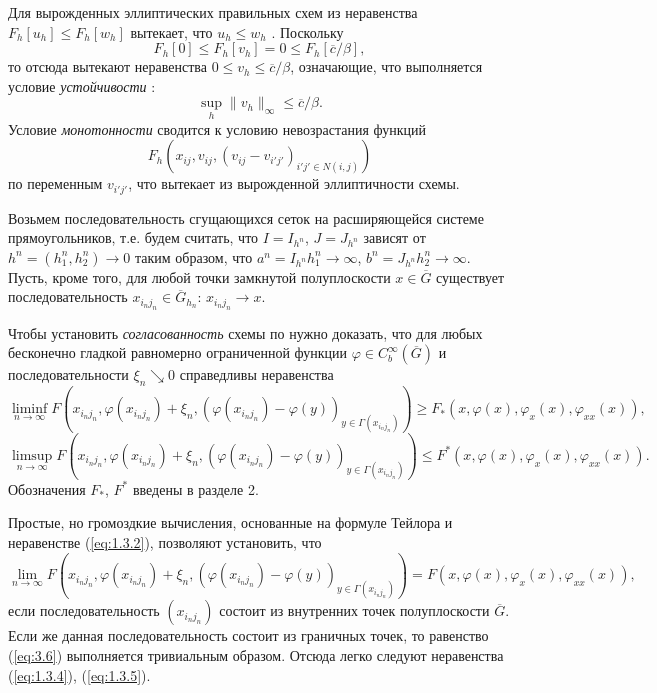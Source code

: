 Для вырожденных эллиптических правильных схем из неравенства $F_h[u_h]\le F_h[w_h]$ вытекает, что $u_h\le w_h$ \cite[теорема 5]{Obe06}. Поскольку
$$ F_h[0]\le F_h[v_h]=0\le F_h[\overline{c}/\beta],$$
то отсюда вытекают неравенства $0\le v_h\le\overline{c}/\beta$, означающие, что выполняется условие \emph{устойчивости} \cite{BarSou91}:
$$\sup_h\|v_h\|_\infty\le \overline{c}/\beta.$$
Условие \emph{монотонности} \cite{BarSou91} сводится к условию невозрастания функций
 $$F_h(x_{ij},v_{ij},(v_{ij}-v_{i'j'})_{i'j'\in N(i,j)})$$
по переменным $v_{i'j'}$, что вытекает из вырожденной эллиптичности схемы.

Возьмем последовательность сгущающихся сеток на расширяющейся системе прямоугольников, т.е. будем считать, что $I=I_{h^n}$, $J=J_{h^n}$ зависят от $h^n=(h_1^n,h_2^n)\to 0$ таким образом, что $a^n=I_{h^n} h_1^n\to\infty$, $b^n=J_{h^n} h_2^n\to\infty$. Пусть, кроме того, для любой точки замкнутой полуплоскости $x\in\overline G$ существует последовательность $x_{i_n j_n}\in\overline G_{h_n}$: $x_{i_n j_n}\to x$.

Чтобы установить \emph{согласованность} схемы по \cite{BarSou91} нужно доказать, что для любых бесконечно гладкой равномерно ограниченной функции $\varphi\in C_b^\infty(\overline G)$ и последовательности $\xi_n\searrow 0$ справедливы неравенства
\begin{equation} \label{eq:1.3.4}
\liminf_{n\to\infty} F\left(x_{i_n j_n},\varphi(x_{i_n j_n})+\xi_n,(\varphi(x_{i_n j_n})-\varphi(y))_{y\in\Gamma(x_{i_n j_n})}\right)\ge
F_*(x,\varphi(x),\varphi_x(x),\varphi_{xx}(x)),
\end{equation}
\begin{equation} \label{eq:1.3.5}
\limsup_{n\to\infty} F\left(x_{i_n j_n},\varphi(x_{i_n j_n})+\xi_n,(\varphi(x_{i_n j_n})-\varphi(y))_{y\in\Gamma(x_{i_n j_n})}\right)\le
F^*(x,\varphi(x),\varphi_x(x),\varphi_{xx}(x)).
\end{equation}
Обозначения $F_*$, $F^*$ введены в разделе 2.

Простые, но громоздкие вычисления, основанные на формуле Тейлора и неравенстве (\ref{eq:1.3.2}), позволяют установить, что
\begin{equation} \label{eq:3.6}
\lim_{n\to\infty} F\left(x_{i_n j_n},\varphi(x_{i_n j_n})+\xi_n,(\varphi(x_{i_n j_n})-\varphi(y))_{y\in\Gamma(x_{i_n j_n})}\right)=F(x,\varphi(x),\varphi_x(x),\varphi_{xx}(x)),
\end{equation}
если последовательность $(x_{i_n j_n})$ состоит из внутренних точек полуплоскости $\overline G$. Если же данная последовательность состоит из граничных точек, то равенство (\ref{eq:3.6}) выполняется тривиальным образом. Отсюда легко следуют неравенства (\ref{eq:1.3.4}), (\ref{eq:1.3.5}).

